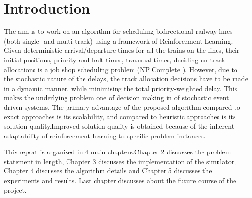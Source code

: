\titleformat{\chapter}[display]{\normalfont\Large\bfseries}{}{11pt}{\Huge}
\chapter{Introduction}
\hspace{3mm}


The aim is to work on an algorithm for scheduling
bidirectional railway lines (both single- and multi-track) using a
framework of Reinforcement Learning. Given deterministic arrival/departure times for
 all the trains on the lines, their initial positions, 
 priority and halt times, traversal times, deciding on track allocations is a 
 job shop scheduling problem (NP Complete ). However, 
 due to the stochastic nature of the delays, 
 the track allocation decisions have to be made in a dynamic manner, 
 while minimising the total priority-weighted delay. 
 This makes the underlying problem one of decision making in of 
 stochastic event driven systems. 
The primary advantage of the proposed algorithm compared to
exact approaches is its scalability, and compared to heuristic
approaches is its solution quality.Improved solution quality is obtained because
of the inherent adaptability of reinforcement learning to specific
problem instances.

\vspace{\baselineskip}
This report is organised in 4 main chapters.Chapter 2 discusses the problem statement in length, 
Chapter 3 discusses the implementation of the simulator, Chapter 4 discusses the algorithm details and 
Chapter 5 discusses the experiments and results. Last chapter discusses about the future course of the project.
